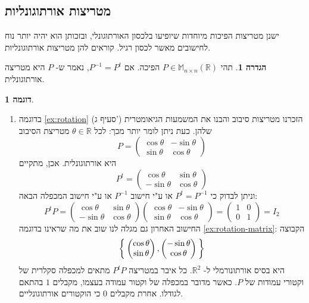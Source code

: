 \documentclass[12pt]{report}
\theoremstyle{plain}
\theoremstyle{definition}
\newtheorem{definition}[theorem]{הגדרה}
\newtheorem{example}{דוגמה}[chapter]
\newcommand{\R}{\mathbb{R}}
\newcommand{\M}{\mathbb{M}}
\newcommand{\0}{\mathbf{0}}
\begin{document}
\subsection{מטריצות אורתוגונליות}

ישנן מטריצות הפיכות מיוחדות שיופיעו בלכסון האורתוגונלי, ובזכותן הוא יהיה יותר נוח לחישובים מאשר לכסון רגיל. קוראים להן מטריצות אורתוגונליות.

\begin{definition}
תהי
$P\in\M_{n\times n}(\R)$
הפיכה. אם
$P^{-1}=P^t$,
נאמר ש-
$P$
היא מטריצה אורתוגונלית.
\end{definition}

\begin{example}\
\begin{enumerate}[label=\alph*.]
\item
בדוגמה
\ref{ex:rotation}
(סעיף ג')
הזכרנו מטריצות סיבוב והבנו את המשמעות הגיאומטרית שלהן. כעת ניתן לומר יותר מכך: לכל
$\theta\in\R$
מטריצת הסיבוב
$$
P=\begin{pmatrix}
\cos\theta & -\sin\theta \\
\sin\theta & \cos\theta
\end{pmatrix}
$$
היא אורתוגונלית. אכן, מתקיים
$$
P^t=\begin{pmatrix}
\cos\theta & \sin\theta \\
-\sin\theta & \cos\theta
\end{pmatrix}
$$
וניתן לבדוק כי
$P^t=P^{-1}$
או ע"י חישוב 
$P^{-1}$
או ע"י חישוב המכפלה הבאה:
$$
P^tP=\begin{pmatrix}
\cos\theta & \sin\theta \\
-\sin\theta & \cos\theta
\end{pmatrix}\begin{pmatrix}
\cos\theta & -\sin\theta \\
\sin\theta & \cos\theta
\end{pmatrix}=\begin{pmatrix}
1 & 0 \\
0 & 1
\end{pmatrix}=I_2
$$
החישוב האחרון גם מגלה לנו שוב את מה שראינו בדוגמה
\ref{ex:rotation-matrix}: 
הקבוצה
$$
\Set{\begin{pmatrix}
\cos{\theta} \\
\sin{\theta}
\end{pmatrix},\begin{pmatrix}
-\sin{\theta} \\
\cos{\theta}
\end{pmatrix}}
$$
היא בסיס אורתונורמלי ל-
$\R^2$.
כל איבר במטריצה 
$P^tP$
מתאים למכפלה סקלרית של וקטורי עמודות של
$P$.
כאשר מדובר במכפלה של וקטור עמודה בעצמו, מקבלים
$1$
בהתאם לגודלו.
אחרת מקבלים 
$0$
כי הוקטורים אורתוגונליים.


\end{enumerate}
\end{example}
\end{document}
